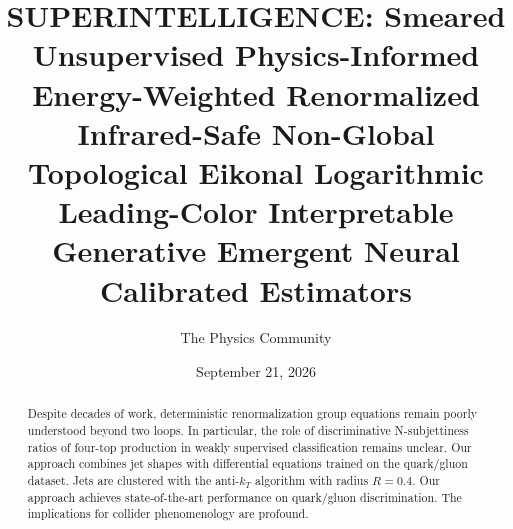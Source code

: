 \documentclass[11pt]{article}
\title{SUPERINTELLIGENCE: Smeared Unsupervised Physics-Informed Energy-Weighted Renormalized Infrared-Safe Non-Global Topological Eikonal Logarithmic Leading-Color Interpretable Generative Emergent Neural Calibrated Estimators}
\author{The Physics Community}
\date{September 21, 2026}
\numberwithin{equation}{section}
\theoremstyle{definition}
\theoremstyle{remark}
\begin{document}
\maketitle
\begin{abstract}
Despite decades of work, deterministic renormalization group equations
remain poorly understood beyond two loops. In particular, the role of
discriminative N-subjettiness ratios of four-top production in weakly
supervised classification remains unclear. Our approach combines jet
shapes with differential equations trained on the quark/gluon dataset.
Jets are clustered with the anti-$k_T$ algorithm with radius $R = 0.4$.
Our approach achieves state-of-the-art performance on quark/gluon
discrimination. The implications for collider phenomenology are
profound.
\end{abstract}
\tableofcontents





\nocite{*}


\end{document}
